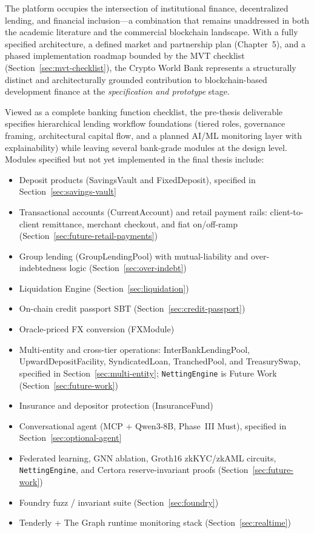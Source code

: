 \documentclass[12pt,a4paper]{report}
\begin{document}
The platform occupies the intersection of institutional finance, decentralized lending, and financial inclusion---a combination that remains unaddressed in both the academic literature and the commercial blockchain landscape. With a fully specified architecture, a defined market and partnership plan (Chapter~5), and a phased implementation roadmap bounded by the MVT checklist (Section~\ref{sec:mvt-checklist}), the Crypto World Bank represents a structurally distinct and architecturally grounded contribution to blockchain-based development finance at the \textit{specification and prototype} stage.

Viewed as a complete banking function checklist, the pre-thesis deliverable specifies hierarchical lending workflow foundations (tiered roles, governance framing, architectural capital flow, and a planned AI/ML monitoring layer with explainability) while leaving several bank-grade modules at the design level. Modules specified but not yet implemented in the final thesis include:
\begin{itemize}[noitemsep]
\item Deposit products (SavingsVault and FixedDeposit), specified in Section~\ref{sec:savings-vault}
\item Transactional accounts (CurrentAccount) and retail payment rails: client-to-client remittance, merchant checkout, and fiat on/off-ramp (Section~\ref{sec:future-retail-payments})
\item Group lending (GroupLendingPool) with mutual-liability and over-indebtedness logic (Section~\ref{sec:over-indebt})
\item Liquidation Engine (Section~\ref{sec:liquidation})
\item On-chain credit passport SBT (Section~\ref{sec:credit-passport})
\item Oracle-priced FX conversion (FXModule)
\item Multi-entity and cross-tier operations: InterBankLendingPool, UpwardDepositFacility, SyndicatedLoan, TranchedPool, and TreasurySwap, specified in Section~\ref{sec:multi-entity}; \texttt{NettingEngine} is Future Work (Section~\ref{sec:future-work})
\item Insurance and depositor protection (InsuranceFund)
\item Conversational agent (MCP + Qwen3-8B, Phase~III Must), specified in Section~\ref{sec:optional-agent}
\item Federated learning, GNN ablation, Groth16 zkKYC/zkAML circuits, \texttt{NettingEngine}, and Certora reserve-invariant proofs (Section~\ref{sec:future-work})
\item Foundry fuzz / invariant suite (Section~\ref{sec:foundry})
\item Tenderly + The Graph runtime monitoring stack (Section~\ref{sec:realtime})
\end{itemize}
\end{document}
